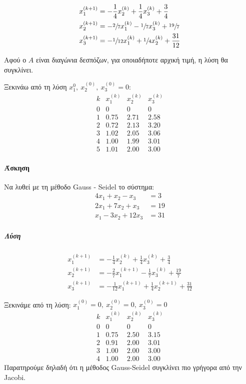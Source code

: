 \documentclass[11pt,a4paper,notitlepage,fleqn,final]{article}
\begin{document}
\begin{align*}
	x_1^{(k+1)} &= -\frac{1}{4}x_2^{(k)}+\frac{1}{4}x_3^{(k)}+\frac{3}{4}
	\\ x_2^{(k+1)} &= -\sfrac{2}{7} x_1^{(k)}-\sfrac{1}{7} x_3^{(k)}
	+ \sfrac{19}{7} \\
	x_3^{(k+1)} &= -\sfrac{1}{12} x_1^{(k)} + \sfrac{1}{4} x_2^{(k)}
	+\frac{31}{12}
\end{align*}

Αφού ο \( A \) είναι διαγώνια δεσπόζων, για οποιαδήποτε αρχική τιμή,
η λύση θα συγκλίνει.

Ξεκινάω από τη λύση \( x_1^{0},\ x_2^{(0)},\ x_3^{(0)}= 0 \):
\[
\begin{array}{cccc}
k & x_1^{(k)} & x_2^{(k)} & x_3^{(k)} \\ \hline
0 & 0 & 0 & 0 \\
1 & 0.75 & 2.71 & 2.58 \\
2 & 0.72 & 2.13 & 3.20 \\
3 & 1.02 & 2.05 & 3.06 \\
4 & 1.00 & 1.99 & 3.01 \\
5 & 1.01 & 2.00 & 3.00
\end{array}
\]

\paragraph{Άσκηση}
Να λυθεί με τη μέθοδο Gauss - Seidel το σύστημα:
\begin{align*}
4x_1+x_2-x_3 &= 3 \\
2x_1+7x_2+x_3 &= 19 \\
x_1-3x_2+12x_3 &= 31
\end{align*}

\subparagraph{Λύση}
\begin{align*}
x_1^{(k+1)} &= -\frac{1}{4}x_2^{(k)}+\frac{1}{4}x_3^{(k)}+\frac{3}{4}
\\ x_2^{(k+1)} &= -\frac{2}{7} x_1^{(k+1)}-\frac{1}{7} x_3^{(k)}
+ \frac{19}{7} \\
x_3^{(k+1)} &= -\frac{1}{12} x_1^{(k+1)} + \frac{1}{4} x_2^{(k+1)}
+\frac{31}{12}
\end{align*}

Ξεκινάμε από τη λύση:
\( x_1^{(0)}=0,\ x_2^{(0)}=0,\ x_3^{(0)}=0 \)
\[
\begin{array}{cccc}
k & x_1^{(k)} & x_2^{(k)} & x_3^{(k)} \\ \hline
0 & 0 & 0 & 0 \\
1 & 0.75 & 2.50 & 3.15 \\
2 & 0.91 & 2.00 & 3.01 \\
3 & 1.00 & 2.00 & 3.00 \\
4 & 1.00 & 2.00 & 3.00
\end{array}
\]
Παρατηρούμε δηλαδή ότι η μέθοδος Gauss-Seidel συγκλίνει πιο γρήγορα από
την Jacobi.
\end{document}
